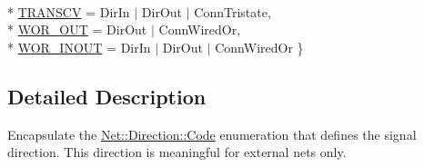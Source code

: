 \begin{DoxyCompactItemize}
\\*
\hyperlink{classHurricane_1_1Net_1_1Direction_a5b34d7c3ac52628861af3a46f781fae4ab8965ba57b68fc4b58c428fc4c8da397}{T\-R\-A\-N\-S\-C\-V} = Dir\-In $|$ Dir\-Out $|$ Conn\-Tristate, 
\\*
\hyperlink{classHurricane_1_1Net_1_1Direction_a5b34d7c3ac52628861af3a46f781fae4a1cc48f96bc28740eb7f0d7ba7e2b237c}{W\-O\-R\-\_\-\-O\-U\-T} = Dir\-Out $|$ Conn\-Wired\-Or, 
\\*
\hyperlink{classHurricane_1_1Net_1_1Direction_a5b34d7c3ac52628861af3a46f781fae4a2fbc95d7882aab3453d5549493763c3c}{W\-O\-R\-\_\-\-I\-N\-O\-U\-T} = Dir\-In $|$ Dir\-Out $|$ Conn\-Wired\-Or
 \}
\end{DoxyCompactItemize}


\subsection{Detailed Description}
Encapsulate the \hyperlink{classHurricane_1_1Net_1_1Direction_a5b34d7c3ac52628861af3a46f781fae4}{Net\-::\-Direction\-::\-Code} enumeration that defines the signal direction. This direction is meaningful for external nets only. 

